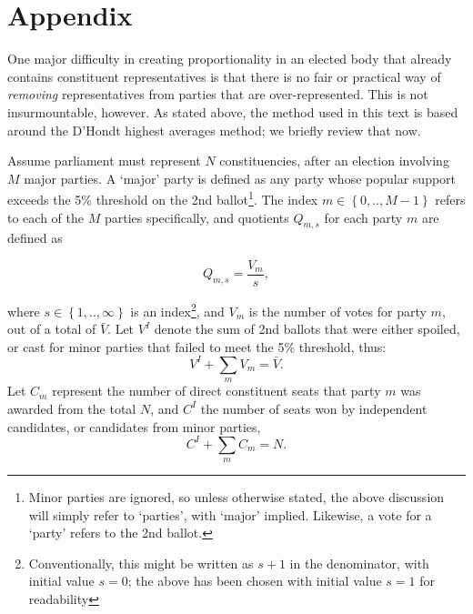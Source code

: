 \documentclass[DIV=calc, paper=a4, fontsize=11pt, twocolumn]{scrartcl}	 %
\begin{document}
\clearpage
\renewcommand{\theequation}{A.\arabic{equation}}
\renewcommand{\thesection}{A.\arabic{section}}
\setcounter{section}{0}
\setcounter{equation}{0}
\section*{Appendix}

One major difficulty in creating proportionality in an elected body that already contains constituent representatives is that there is no fair or practical way of \emph{removing} representatives from parties that are over-represented. 
This is not insurmountable, however. As stated above, the method used in this text is based around the D'Hondt highest averages method; we briefly review that now. 

Assume parliament must represent $N$ constituencies, after an election involving $M$ major parties. A `major' party is defined as any party whose popular support exceeds the 5\% threshold on the 2nd ballot\footnote{Minor parties are ignored, so unless otherwise stated, the above discussion will simply refer to `parties', with `major' implied. Likewise, a vote for a `party' refers to the 2nd ballot.}. 
The index  $m \in \left\{0, .., M-1\right\} $  refers to each of the $M$ parties specifically, and quotients $Q_{m,s}$ for each party $m$ are defined as 

\begin{equation}
\label{eq:DhondtSupp}
Q_{m,s} = \frac{V_m}{s},
\end{equation}

where $s \in \left\{ 1,.., \infty \right\}$ is an index\footnote{Conventionally, this might be written as $s+1$ in the denominator, with initial value $s=0$; the above has been chosen with initial value $s=1$ for readability}, and  $V_m$ is the number of votes for party $m$, out of a total of $\bar{V}$. Let $V^I$ denote the sum of 2nd ballots that were either spoiled, or cast for minor parties that failed to meet the 5\% threshold, thus: 
\begin{equation}
\label{eq:sum_Vm}
V^I + \sum_m V_m = \bar{V}.
\end{equation}
Let $C_m$ represent the number of direct constituent seats that party $m$ was awarded from the total $N$, and $C^I$ the number of seats won by independent candidates, or candidates from minor parties,
\begin{equation}
\label{eq:sum_Cm}
C^I + \sum_m C_m = N.
\end{equation}
\end{document}
